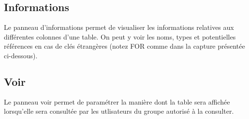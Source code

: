 \documentclass[letterpaper,10pt,english]{sphinxmanual}
\begin{document}


\subsection{Informations}
\label{tables/infopanel:informations}
Le panneau d'informations permet de visualiser les informations
relatives aux différentes colonnes d'une table. On peut y voir les
noms, types et potentielles références en cas de clés étrangères
(notez FOR comme dans la capture présentée ci-dessous).



\subsection{Voir}
\label{tables/infopanel:voir}
Le panneau voir permet de paramétrer la manière dont la table sera
affichée lorsqu'elle sera consultée par les utlisateurs du groupe
autorisé à la consulter.
\end{document}
